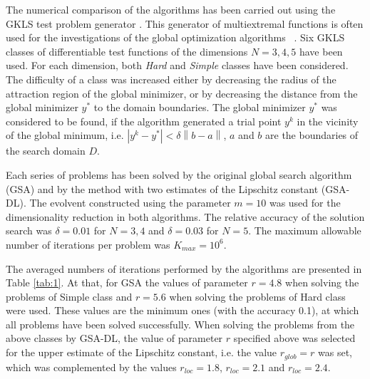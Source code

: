 \documentclass[runningheads]{llncs}
\begin{document}
The numerical comparison of the algorithms has been carried out using the GKLS 
test problem generator \cite{Gaviano2003}. 
This generator of multiextremal functions is often used for the investigations of the global 
optimization algorithms ~\cite{Barkalov2018,Paulavicius2014,Sergeyev2015}.
Six GKLS classes of differentiable test functions of the dimensions $N = 3,4,5$
have been used. For each dimension, both \textit{Hard} and \textit{Simple}
classes have been considered. The difficulty of a class was increased either by
decreasing the radius of the attraction region of the global minimizer, or by
decreasing the distance from the global minimizer $y^\ast$ to the domain
boundaries. The global minimizer $y^\ast$ was considered to be found, if the
algorithm generated a trial point $y^k$ in the vicinity of the global minimum,
i.e. $\left|y^k-y^\ast\right| <\delta\left\|b-a\right\|$, 
$a$ and $b$ are the boundaries of the search domain $D$. 

Each series of problems has been solved by the original global search algorithm (GSA) and by the method with two estimates of the Lipschitz constant (GSA-DL). The evolvent constructed using the parameter $m = 10$ was used for the dimensionality reduction in both algorithms. The relative accuracy of the solution search was $\delta = 0.01$ for $N=3,4$ and $\delta = 0.03$ for $N=5$.
The maximum allowable number of iterations per problem was $K_{max} = 10^6$.

The averaged numbers of iterations performed by the algorithms are presented in Table \ref{tab:1}.
At that, for GSA the values of parameter $r=4.8$ when solving the problems of Simple class and $r=5.6$ when solving the problems of Hard class were used. 
These values are the minimum ones (with the accuracy 0.1), at which all problems have been solved successfully.
When solving the problems from the above classes by GSA-DL, the value of parameter $r$ specified above was selected for the upper estimate of the Lipschitz constant, i.e. the value $r_{glob} = r$ was set, which was complemented by the values $r_{loc}=1.8$, $r_{loc}=2.1$ and $r_{loc}=2.4$. 
\end{document}
